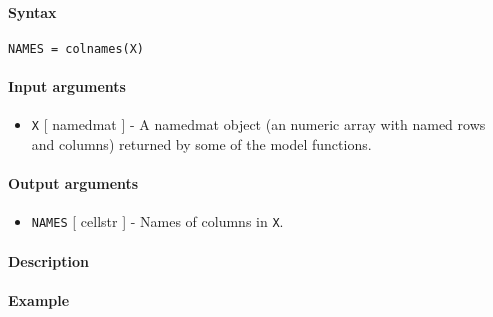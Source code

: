 


	\paragraph{Syntax}

\begin{verbatim}
NAMES = colnames(X)
\end{verbatim}

\paragraph{Input arguments}

\begin{itemize}
\itemsep1pt\parskip0pt
\item
  \texttt{X} {[} namedmat {]} - A namedmat object (an numeric array with
  named rows and columns) returned by some of the model functions.
\end{itemize}

\paragraph{Output arguments}

\begin{itemize}
\itemsep1pt\parskip0pt
\item
  \texttt{NAMES} {[} cellstr {]} - Names of columns in \texttt{X}.
\end{itemize}

\paragraph{Description}

\paragraph{Example}


